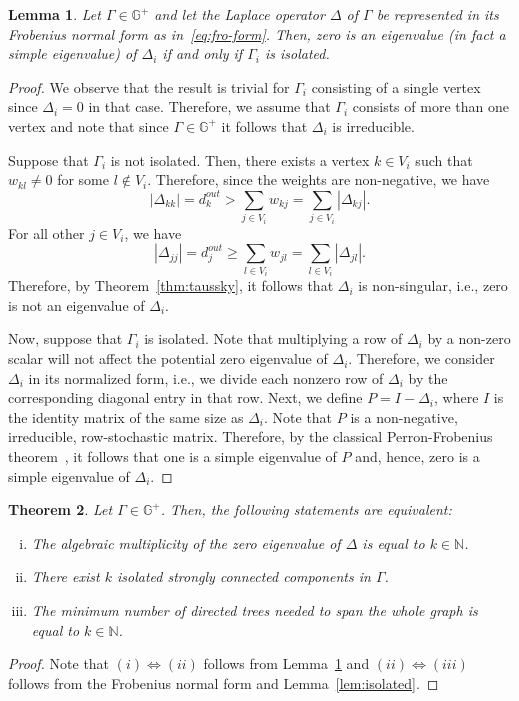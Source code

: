 \documentclass{article}
\newtheorem{theorem}{Theorem}[section]
\newtheorem{lemma}[theorem]{Lemma}
\newcommand\abs[1]{\left|#1\right|}
\begin{document}
\begin{lemma}\label{lem:zero-eig}
Let $\Gamma\in\mathbb{G}^{+}$ and let the Laplace operator $\Delta$ of $\Gamma$ be represented in its Frobenius normal form as in~\eqref{eq:fro-form}.
Then, zero is an eigenvalue (in fact a simple eigenvalue) of $\Delta_{i}$ if and only if $\Gamma_{i}$ is isolated.  
\end{lemma}
\begin{proof}
We observe that the result is trivial for $\Gamma_{i}$ consisting of a single vertex since $\Delta_{i}=0$ in that case.
Therefore, we assume that $\Gamma_{i}$ consists of more than one vertex and note that since $\Gamma\in\mathbb{G}^{+}$ it follows that $\Delta_{i}$ is irreducible.

Suppose that $\Gamma_{i}$ is not isolated.
Then, there exists a vertex $k\in V_{i}$ such that $w_{kl}\neq 0$ for some $l\notin V_{i}$.
Therefore, since the weights are non-negative, we have
\[
\abs{\Delta_{kk}}=d_{k}^{out} > \sum_{j\in V_{i}}w_{kj}=\sum_{j\in V_{i}}\abs{\Delta_{kj}}. 
\]
For all other $j\in V_{i}$, we have
\[
\abs{\Delta_{jj}}=d_{j}^{out} \geq \sum_{l\in V_{i}}w_{jl}=\sum_{l\in V_{i}}\abs{\Delta_{jl}}. 
\]
Therefore, by Theorem~\ref{thm:taussky}, it follows that $\Delta_{i}$ is non-singular, i.e., zero is not an eigenvalue of $\Delta_{i}$.

Now, suppose that $\Gamma_{i}$ is isolated.
Note that multiplying a row of $\Delta_{i}$ by a non-zero scalar will not affect the potential zero eigenvalue of $\Delta_{i}$.
Therefore, we consider $\Delta_{i}$ in its normalized form, i.e., we divide each nonzero row of $\Delta_{i}$ by the corresponding diagonal entry in that row.
Next, we define $P=I-\Delta_{i}$, where $I$ is the identity matrix of the same size as $\Delta_{i}$.
Note that $P$ is a non-negative, irreducible, row-stochastic matrix. 
Therefore, by the classical Perron-Frobenius theorem~\cite{Berman1994}, it follows that one is a simple eigenvalue of $P$ and, hence, zero is a simple eigenvalue of $\Delta_{i}$.
\end{proof}

\begin{theorem}
Let $\Gamma\in\mathbb{G}^{+}$.
Then, the following statements are equivalent:
\begin{enumerate}[i.]
\item	The algebraic multiplicity of the zero eigenvalue of $\Delta$ is equal to $k\in\mathbb{N}$.
\item	There exist $k$ isolated strongly connected components in $\Gamma$.
\item	The minimum number of directed trees needed to span the whole graph is equal to $k\in\mathbb{N}$. 
\end{enumerate}
\end{theorem}
\begin{proof}
Note that $(i)\Leftrightarrow(ii)$ follows from Lemma~\ref{lem:zero-eig} and $(ii)\Leftrightarrow(iii)$ follows from the Frobenius normal form and Lemma~\ref{lem:isolated}.
\end{proof}
\end{document}
